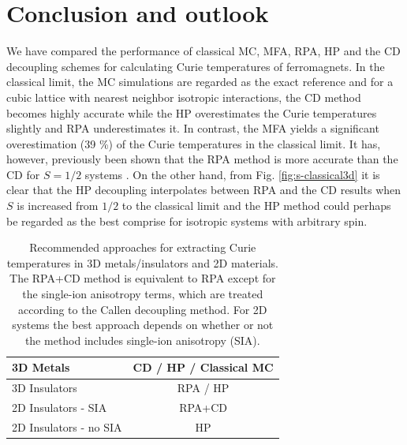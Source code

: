 \documentclass[aps,prb,reprint,floatfix,superscriptaddress]{revtex4-2}
\begin{document}
\section{Conclusion and outlook}\label{sec:conclusion}
We have compared the performance of classical MC, MFA, RPA, HP and the CD decoupling schemes for calculating Curie temperatures of ferromagnets. In the classical limit, the MC simulations are regarded as the exact reference and for a cubic lattice with nearest neighbor isotropic interactions, the CD method becomes highly accurate while the HP overestimates the Curie temperatures slightly and RPA underestimates it. In contrast, the MFA yields a significant overestimation (39 {\%}) of the Curie temperatures in the classical limit. It has, however, previously been shown that the RPA method is more accurate than the CD for $S=1/2$ systems \cite{FROBRICH2006223}. On the other hand, from Fig. \ref{fig:s-classical3d} it is clear that the HP decoupling interpolates between RPA and the CD results when $S$ is increased from $1/2$ to the classical limit and the HP method could perhaps be regarded as the best comprise for isotropic systems with arbitrary spin.
\begin{table}[tb]
\begin{center}
\begin{tabular}{| l | c |}
\hline
 3D Metals & CD / HP / Classical MC \\ 
 \hline
 3D Insulators & RPA  / HP\\
 \hline
 2D Insulators - SIA  & RPA+CD \\ 
\hline
 2D Insulators - no SIA & HP \\ 
\hline
\end{tabular}
\end{center}\label{tab:recommended}
\caption{Recommended approaches for extracting Curie temperatures in 3D metals/insulators and 2D materials. The RPA+CD method is equivalent to RPA except for the single-ion anisotropy terms, which are treated according to the Callen decoupling method. For 2D systems the best approach depends on whether or not the method includes single-ion anisotropy (SIA).}
\end{table}
\end{document}
